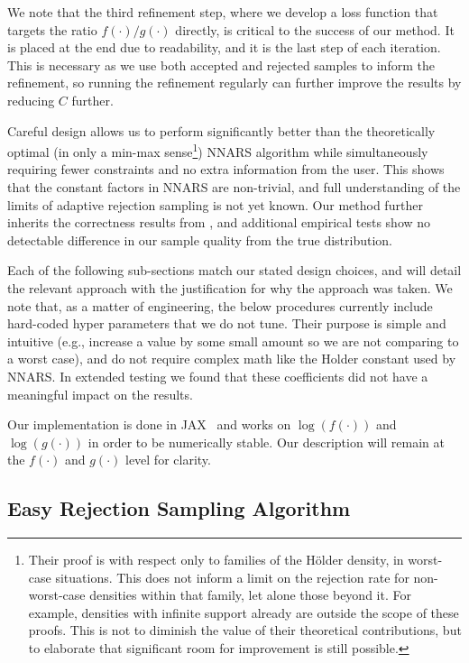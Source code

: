 \documentclass{ecai}  %
\begin{document}
We note that the third refinement step, where we develop a loss function that targets the ratio $f(\cdot)/g(\cdot)$ directly, is critical to the success of our method. It is placed at the end due to readability, and it is the last step of each iteration. This is necessary as we use both accepted and rejected samples to inform the refinement, so running the refinement regularly can further improve the results by reducing $C$ further. 

 
Careful design allows us to perform significantly better than the theoretically optimal (in only a min-max sense\footnote{Their proof is with respect only to families of the  H\"{o}lder density, in worst-case situations. This does not inform a limit on the rejection rate for non-worst-case densities within that family, let alone those beyond it. For example, densities with infinite support already are outside the scope of these proofs. This is not to diminish the value of their theoretical contributions, but to elaborate that significant room for improvement is still possible.}) NNARS algorithm while simultaneously requiring fewer constraints and no extra information from the user. This shows that the constant factors in NNARS are non-trivial, and full understanding of the limits of adaptive rejection sampling is not yet known.   Our method further inherits the correctness results from  \cite{Caffo2002}, and additional empirical tests show no detectable difference in our sample quality from the true distribution. 



Each of the following sub-sections match our stated design choices, and will detail the relevant approach with the justification for why the approach was taken. We note that, as a matter of engineering, the below procedures currently include hard-coded hyper parameters that we do not tune. Their purpose is simple and intuitive (e.g., increase a value by some small amount so we are not comparing to a worst case), and do not require complex math like the Holder constant used by NNARS. In extended testing we found that these coefficients did not have a meaningful impact on the results. 

Our implementation is done in JAX~\cite{jax2018github} and works on $\log(f(\cdot))$ and $\log(g(\cdot))$ in order to be numerically stable. Our description will remain at the $f(\cdot)$ and $g(\cdot)$ level for clarity. 

\subsection{Easy Rejection Sampling Algorithm}
\end{document}
